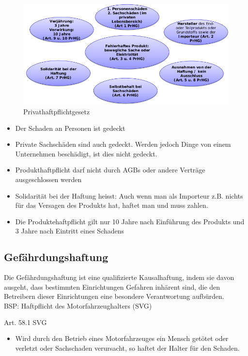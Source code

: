\begin{figure}
\centering
\includegraphics{figures/produkthaftpflicht.png}
\caption{Privathaftpflichtgesetz}
\end{figure}

\begin{itemize}
\tightlist
\item
  Der Schaden an Personen ist gedeckt
\item
  Private Sachschäden sind auch gedeckt. Werden jedoch Dinge von einem
  Unternehmen beschädigt, ist dies nicht gedeckt.
\item
  Produkthaftpflicht darf nicht durch AGBs oder andere Verträge
  ausgeschlossen werden
\item
  Solidarität bei der Haftung heisst: Auch wenn man als Importeur z.B.
  nichts für das Versagen des Produkts hat, haftet man und muss zahlen.
\item
  Die Produktehaftpflicht gilt nur 10 Jahre nach Einführung des Produkts
  und 3 Jahre nach Eintritt eines Schadens
\end{itemize}

\hypertarget{gefuxe4hrdungshaftung}{%
\subsection{Gefährdungshaftung}\label{gefuxe4hrdungshaftung}}

Die Gefährdungshaftung ist eine qualifizierte Kausalhaftung, indem sie
davon ausgeht, dass bestimmten Einrichtungen Gefahren inhärent sind, die
den Betreibern dieser Einrichtungen eine besondere Verantwortung
aufbürden.\\
BSP: Haftpflicht des Motorfahrzeughalters (SVG)

Art. 58.1 SVG

\begin{itemize}
\tightlist
\item
  Wird durch den Betrieb eines Motorfahrzeuges ein Mensch getötet oder
  verletzt oder Sachschaden verursacht, so haftet der Halter für den
  Schaden.
\end{itemize}

